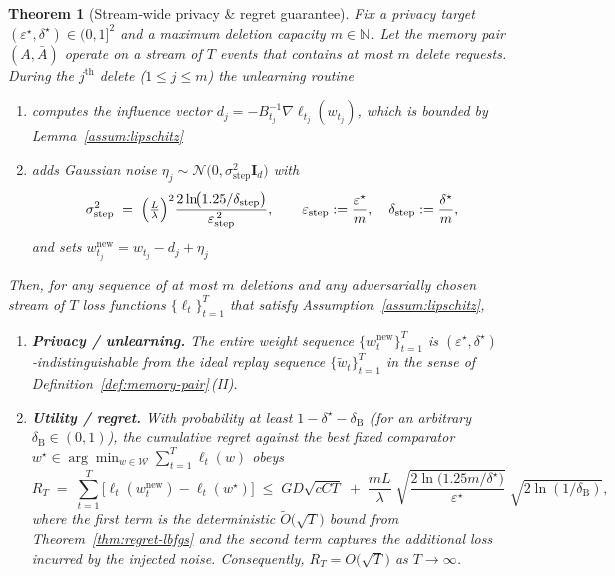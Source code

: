 \documentclass[a4paper,12pt]{article}
\newtheorem{theorem}{Theorem}[section]
\begin{document}
\begin{theorem}[Stream‑wide privacy \& regret guarantee]
\label{thm:comp-privacy-regret}
Fix a privacy target $(\varepsilon^{\star},\delta^{\star})\in(0,1]^{2}$ and a maximum deletion capacity $m\in\mathbb{N}$. Let the memory pair $(A,\bar A)$ operate on a stream of $T$ events that contains at most $m$ delete requests. During the $j^{\text{th}}$ delete ($1\le j\le m$) the unlearning routine

\begin{enumerate}
    \item computes the influence vector $d_{j} = -B_{t_{j}}^{-1}\nabla \ell_{t_{j}}(w_{t_{j}})$, which is bounded by Lemma~\ref{assum:lipschitz}
    \item adds Gaussian noise $\eta_j\sim\mathcal N\!\bigl(0,\sigma_{\text{step}}^2\mathbf I_d\bigr)$ with 
    \[
    \sigma_{\text{step}}^2
    \;=\;
    \Bigl(\tfrac{L}{\lambda}\Bigr)^2
    \frac{2\ln\!\bigl(1.25/\delta_{\text{step}}\bigr)}%
         {\varepsilon_{\text{step}}^{\,2}},
    \qquad
    \varepsilon_{\text{step}}:=\frac{\varepsilon^\star}{m},
    \quad
    \delta_{\text{step}}:=\frac{\delta^\star}{m},
  \]
    and sets $w_{t_j}^{\text{new}} = w_{t_j}-d_j+\eta_j$
\end{enumerate}

Then, for \emph{any} sequence of at most $m$ deletions and \emph{any}
adversarially chosen stream of $T$ loss functions
$\{\ell_t\}_{t=1}^{T}$ that satisfy Assumption~\ref{assum:lipschitz},

\begin{enumerate}
\item \textbf{Privacy / unlearning.}  
      The entire weight sequence $\{w_t^{\text{new}}\}_{t=1}^{T}$
      is $(\varepsilon^\star,\delta^\star)$‑indistinguishable
      from the ideal replay sequence
      $\{\tilde w_t\}_{t=1}^{T}$ in the sense of
      Definition~\ref{def:memory-pair}\,(II).

\item \textbf{Utility / regret.}  
      With probability at least
      $1-\delta^\star-\delta_{\mathrm{B}}$ (for an arbitrary
      $\delta_{\mathrm{B}}\!\in\!(0,1)$),
      the cumulative regret against the best fixed comparator
      $w^\star\in\arg\min_{w\in\mathcal W}\sum_{t=1}^{T}\ell_t(w)$ obeys
      \[
        R_T
        \;=\;
        \sum_{t=1}^{T}\bigl[\ell_t(w_t^{\text{new}})-\ell_t(w^\star)\bigr]
        \;\le\;
        GD\sqrt{cCT}
        \;+\;
        \frac{mL}{\lambda}\;
        \sqrt{\frac{2\ln\!\bigl(1.25m/\delta^\star\bigr)}%
                   {\varepsilon^\star}}\;
        \sqrt{2\ln(1/\delta_{\mathrm{B}})},
      \]
      where the first term is the deterministic
      $\tilde O\!\bigl(\sqrt{T}\bigr)$ bound from
      Theorem~\ref{thm:regret-lbfgs} and the second term captures the
      additional loss incurred by the injected noise.
      Consequently, $R_T = O\!\bigl(\sqrt{T}\bigr)$ as
      $T\!\to\!\infty$.
\end{enumerate}
\end{theorem}
\end{document}
